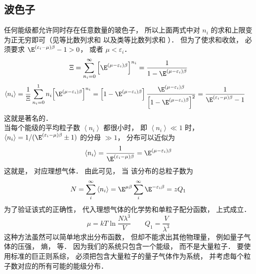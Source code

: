 \subsection{波色子} 
任何能级都允许同时存在任意数量的玻色子， 所以上面两式中对 ${n_i}$ 的求和上限变为正无穷即可（见等比数列求和%
以及类等比数列求和%
）． 但为了使求和收敛， 必须要求 ${\E^{\left( {{\varepsilon _i} - \mu } \right)\beta }} - 1 > 0$，  或者 $\mu  < {\varepsilon _i}$． 
\begin{equation}
  \Xi  = \sum\limits_{{n_i} = 0}^\infty  {{{\left[ {{\E^{\left( {\mu  - {\varepsilon _i}} \right)\beta }}} \right]}^{{n_i}}}}  = \frac{1}{{1 - {\E^{\left( {\mu  - {\varepsilon _i}} \right)\beta }}}}
\end{equation}
\begin{equation}
\begin{aligned}
  \left\langle {{n_i}} \right\rangle & = \frac{1}{\Xi }\sum\limits_{{n_i} = 0}^1 {{n_i}{{\left[ {{\E^{\left( {\mu  - {\varepsilon _i}} \right)\beta }}} \right]}^{{n_i}}}} = \left[ {1 - {\E^{\left( {\mu  - {\varepsilon _i}} \right)\beta }}} \right]\frac{{{\E^{\left( {\mu  - {\varepsilon _i}} \right)\beta }}}}{{{{\left[ {1 - {\E^{\left( {\mu  - {\varepsilon _i}} \right)\beta }}} \right]}^2}}}  = \frac{1}{{{\E^{\left( {{\varepsilon _i} - \mu } \right)\beta }} - 1}}
  \end{aligned}
\end{equation}
这就是著名的．\\
当每个能级的平均粒子数 $\left\langle {{n_i}} \right\rangle $ 都很小时， 即 $\left\langle {{n_i}} \right\rangle \ll 1$ 时， $\left\langle {{n_i}} \right\rangle  = {1}/({{{\E^{\left( {{\varepsilon _i} - \mu } \right)\beta }} \pm 1}})$ 的分母 $ \gg 1$，  分布可以近似为
\begin{equation}
  \left\langle {{n_i}} \right\rangle  = \frac{1}{{{\E^{\left( {{\varepsilon _i} - \mu } \right)\beta }}}} = {\E^{\left( {\mu  - {\varepsilon _i}} \right)\beta }}
\end{equation}
这就是， 对应理想气体． 由此可见， 当 %
该分布的总粒子数为
\begin{equation}
  N = \sum\limits_i^\infty  {\left\langle {{n_i}} \right\rangle }  = {\E^{\mu \beta }}\sum\limits_i^\infty  {{\E^{ - {\varepsilon _i}\beta }}}  = z{Q_1}
\end{equation}
为了验证该式的正确性， 代入理想气体的化学势和单粒子配分函数， 上式成立．
\begin{equation}
  \mu  = kT\ln \frac{{N{\lambda ^3}}}{V} 
  \qquad
  {Q_1} = \frac{V}{{{\lambda ^3}}}
\end{equation}
这种方法虽然可以简单地求出分布函数， 但却不能求出其他物理量， 例如量子气体的压强， 熵， 等． 因为我们的系统只包含一个能级， 而不是大量粒子． 要使用标准的巨正则系综， 必须把包含大量粒子的量子气体作为系统， 并考虑每个粒子数对应的所有可能的能级分布．\\